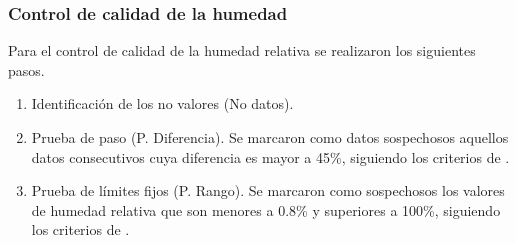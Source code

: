 \subsubsection{Control de calidad de la humedad}

Para el control de calidad de la humedad relativa se realizaron los siguientes pasos.\\

\begin{enumerate}
\item Identificación de los no valores (No datos).\\
\item Prueba de paso (P. Diferencia). Se marcaron como datos sospechosos aquellos datos consecutivos cuya diferencia es mayor a 45\%, siguiendo los criterios de \citet{estevez2011}.\\
\item Prueba de límites fijos (P. Rango).
Se marcaron como sospechosos los valores de humedad relativa que son menores a 0.8\% y superiores a 100\%, siguiendo los criterios de \citet{estevez2011}.

\end{enumerate}

